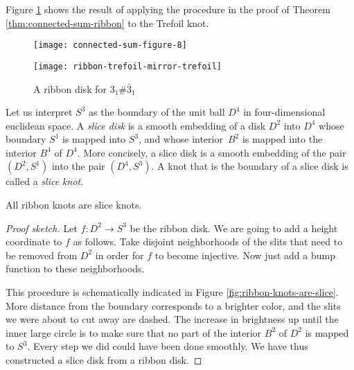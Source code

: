 \documentclass[main.tex]{subfiles}
\begin{document}
\begin{example}
Figure \ref{fig:ribbon-trefoil-mirror-trefoil} shows the result of applying the procedure in the proof of Theorem \ref{thm:connected-sum-ribbon} to the Trefoil knot.

\begin{figure}[htb]
\centering
\begin{minipage}{0.45\textwidth}
\centering
\texttt{[image: connected-sum-figure-8]}
\caption{$3_1 \# \bar{3}_1$}
\label{fig:connected-sum-figure-8}
\end{minipage}%
\begin{minipage}{0.45\textwidth}
\centering
\texttt{[image: ribbon-trefoil-mirror-trefoil]}
\caption{A ribbon disk for $3_1 \# \bar{3}_1$}
\label{fig:ribbon-trefoil-mirror-trefoil}
\end{minipage}
\end{figure}
\end{example}

Let us interpret $S^3$ as the boundary of the unit ball $D^4$ in four-dimensional euclidean space. A \textit{slice disk} is a smooth embedding of a disk $D^2$ into $D^4$ whose boundary $S^1$ is mapped into $S^3$, and whose interior~$B^2$ is mapped into the interior $B^4$ of $D^4$. More concisely, a slice disk is a smooth embedding of the pair~$(D^2, S^1)$ into the pair $(D^4, S^3)$. A knot that is the boundary of a slice disk is called a \textit{slice knot}.

\begin{theorem}\label{thm:ribbon-are-slice}
All ribbon knots are slice knots.
\end{theorem}

\begin{proof}[Proof sketch]
Let $f: D^2 \rightarrow S^3$ be the ribbon disk. We are going to add a height coordinate to $f$ as follows. Take disjoint neighborhoods of the slits that need to be removed from $D^2$ in order for $f$ to become injective. Now just add a bump function to these neighborhoods.

This procedure is schematically indicated in Figure \ref{fig:ribbon-knots-are-slice}. More distance from the boundary corresponds to a brighter color, and the slits we were about to cut away are dashed. The increase in brightness up until the inner large circle is to make sure that no part of the interior $B^2$ of $D^2$ is mapped to $S^3$.
Every step we did could have been done smoothly. We have thus constructed a slice disk from a ribbon disk.
\end{proof}
\end{document}

